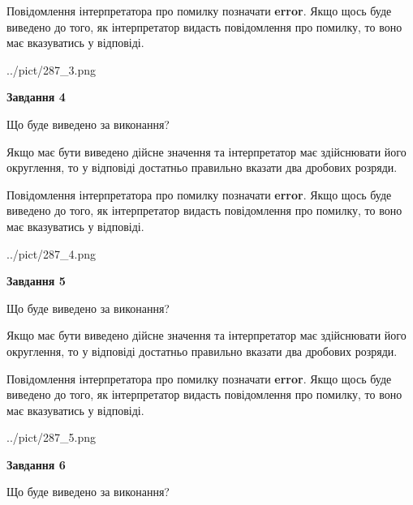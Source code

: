 \documentclass[12pt, ukrainian]{article}
\begin{document}
{\begin {Large}
Повідомлення інтерпретатора про помилку позначати \textbf{error}.
Якщо щось буде виведено до того, як інтерпретатор видасть повідомлення про помилку, 
то воно має вказуватись у відповіді. \par

\begin{center}
	{../pict/287_3.png}
\end{center}
\newpage

{\begin {center}\textbf{Завдання 4}\end {center}}\par
Що буде виведено за виконання? \par

Якщо має бути виведено дійсне значення та інтерпретатор має здійснювати його округлення, 
то у відповіді достатньо правильно вказати два дробових розряди.

Повідомлення інтерпретатора про помилку позначати \textbf{error}.
Якщо щось буде виведено до того, як інтерпретатор видасть повідомлення про помилку, 
то воно має вказуватись у відповіді. \par

\begin{center}
	{../pict/287_4.png}
\end{center}
\newpage

{\begin {center}\textbf{Завдання 5}\end {center}}\par
Що буде виведено за виконання? \par

Якщо має бути виведено дійсне значення та інтерпретатор має здійснювати його округлення, 
то у відповіді достатньо правильно вказати два дробових розряди.

Повідомлення інтерпретатора про помилку позначати \textbf{error}.
Якщо щось буде виведено до того, як інтерпретатор видасть повідомлення про помилку, 
то воно має вказуватись у відповіді. \par

\begin{center}
	{../pict/287_5.png}
\end{center}
\newpage

{\begin {center}\textbf{Завдання 6}\end {center}}\par
Що буде виведено за виконання? \par


\end{Large}}
\end{document}
